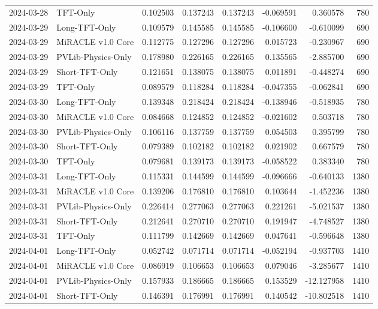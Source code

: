 \begin{tabular}{llrrrrrr}
2024-03-28 & TFT-Only & 0.102503 & 0.137243 & 0.137243 & -0.069591 & 0.360578 & 780 \\
2024-03-29 & Long-TFT-Only & 0.109579 & 0.145585 & 0.145585 & -0.106600 & -0.610099 & 690 \\
2024-03-29 & MiRACLE v1.0 Core & 0.112775 & 0.127296 & 0.127296 & 0.015723 & -0.230967 & 690 \\
2024-03-29 & PVLib-Physics-Only & 0.178980 & 0.226165 & 0.226165 & 0.135565 & -2.885700 & 690 \\
2024-03-29 & Short-TFT-Only & 0.121651 & 0.138075 & 0.138075 & 0.011891 & -0.448274 & 690 \\
2024-03-29 & TFT-Only & 0.089579 & 0.118284 & 0.118284 & -0.047355 & -0.062841 & 690 \\
2024-03-30 & Long-TFT-Only & 0.139348 & 0.218424 & 0.218424 & -0.138946 & -0.518935 & 780 \\
2024-03-30 & MiRACLE v1.0 Core & 0.084668 & 0.124852 & 0.124852 & -0.021602 & 0.503718 & 780 \\
2024-03-30 & PVLib-Physics-Only & 0.106116 & 0.137759 & 0.137759 & 0.054503 & 0.395799 & 780 \\
2024-03-30 & Short-TFT-Only & 0.079389 & 0.102182 & 0.102182 & 0.021902 & 0.667579 & 780 \\
2024-03-30 & TFT-Only & 0.079681 & 0.139173 & 0.139173 & -0.058522 & 0.383340 & 780 \\
2024-03-31 & Long-TFT-Only & 0.115331 & 0.144599 & 0.144599 & -0.096666 & -0.640133 & 1380 \\
2024-03-31 & MiRACLE v1.0 Core & 0.139206 & 0.176810 & 0.176810 & 0.103644 & -1.452236 & 1380 \\
2024-03-31 & PVLib-Physics-Only & 0.226414 & 0.277063 & 0.277063 & 0.221261 & -5.021537 & 1380 \\
2024-03-31 & Short-TFT-Only & 0.212641 & 0.270710 & 0.270710 & 0.191947 & -4.748527 & 1380 \\
2024-03-31 & TFT-Only & 0.111799 & 0.142669 & 0.142669 & 0.047641 & -0.596648 & 1380 \\
2024-04-01 & Long-TFT-Only & 0.052742 & 0.071714 & 0.071714 & -0.052194 & -0.937703 & 1410 \\
2024-04-01 & MiRACLE v1.0 Core & 0.086919 & 0.106653 & 0.106653 & 0.079046 & -3.285677 & 1410 \\
2024-04-01 & PVLib-Physics-Only & 0.157933 & 0.186665 & 0.186665 & 0.153529 & -12.127958 & 1410 \\
2024-04-01 & Short-TFT-Only & 0.146391 & 0.176991 & 0.176991 & 0.140542 & -10.802518 & 1410 \\

\end{tabular}
